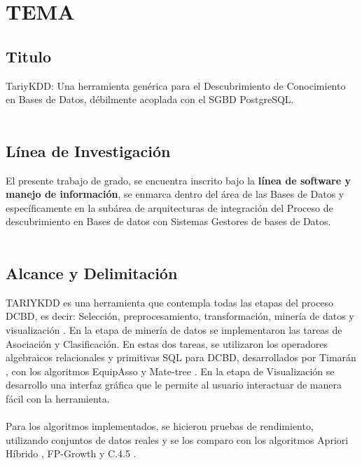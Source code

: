 \chapter{TEMA}
\section{Titulo}
TariyKDD: Una herramienta gen\'erica para el Descubrimiento de Conocimiento en Bases de Datos, d\'ebilmente acoplada con el SGBD PostgreSQL.\\
\\
\section{L\'inea de Investigaci\'on}
El presente trabajo de grado, se encuentra inscrito bajo la \textbf{l\'inea de software y
manejo de informaci\'on}, se enmarca dentro del \'area de las Bases de Datos y
espec\'ificamente en la sub\'area  de arquitecturas de integraci\'on del Proceso de
descubrimiento en Bases de datos con Sistemas Gestores de bases de Datos.\\
\\
\section{Alcance y Delimitaci\'on}
TARIYKDD es una herramienta que contempla todas las etapas del proceso DCBD, es decir:
Selecci\'on, preprocesamiento, transformaci\'on, miner\'ia de datos y visualizaci\'on
\cite{1, 4, 16}. En la etapa de miner\'ia de datos se implementaron las tareas de
Asociaci\'on y Clasificaci\'on. En estas dos tareas, se utilizaron los operadores
algebraicos relacionales  y primitivas SQL para DCBD, desarrollados por Timar\'an
\cite{32, 35}, con los algoritmos EquipAsso \cite{33, 34, 35} y Mate-tree \cite{35}. En
la etapa de Visualizaci\'on se desarrollo una interfaz gr\'afica que le permite al
usuario interactuar de manera f\'acil con la herramienta.\\
\\
Para los algoritmos implementados, se hicieron pruebas de rendimiento, utilizando
conjuntos de datos reales y se los comparo con los algoritmos Apriori H\'ibrido \cite{4},
FP-Growth \cite{17, 19} y C.4.5 \cite{25, 26}.\\
\\
